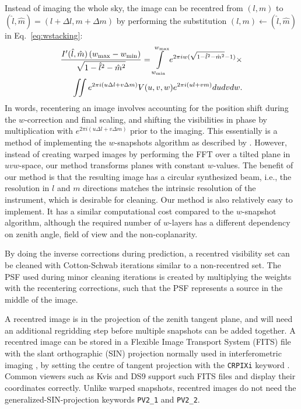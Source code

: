 \documentclass[useAMS,usenatbib]{mn2e}
\begin{document}
Instead of imaging the whole sky, the image can be recentred from $(l,m)$ to $(\hat{l},\hat{m})=(l+\Delta l,m+\Delta m)$ by performing the substitution $(l,m)\leftarrow(\hat{l},\hat{m})$ in Eq.~\eqref{eq:wstacking}:
\begin{align}\notag
\frac{I'(\hat{l}, \hat{m})\left(w_{\max} - w_{\min}\right)}{\sqrt{1-\hat{l}^2-\hat{m}^2}} = \int\limits_{w_{\min}}^{w_{\max}} e^{2\pi i w(\sqrt{1-\hat{l}^2-\hat{m}^2}-1)} \times \\
\iint e^{2 \pi i \left(u\Delta l + v\Delta m\right)} V(u,v,w) e^{2\pi i \left(ul + vm\right)} du dv dw.
\end{align}
In words, recentering an image involves accounting for the position shift during the $w$-correction and final scaling, and shifting the visibilities in phase by multiplication with $e^{2 \pi i \left(u\Delta l + v\Delta m\right)}$ prior to the imaging. This essentially is a method of implementing the $w$-snapshots algorithm as described by \citet{widefield-imaging-ska-cornwell}. However, instead of creating warped images by performing the FFT over a tilted plane in $uvw$-space, our method transforms planes with constant $w$-values. The benefit of our method is that the resulting image has a circular synthesized beam, i.e., the resolution in $l$ and $m$ directions matches the intrinsic resolution of the instrument, which is desirable for cleaning. Our method is also relatively easy to implement. It has a similar computational cost compared to the $w$-snapshot algorithm, although the required number of $w$-layers has a different dependency on zenith angle, field of view and the non-coplanarity.

By doing the inverse corrections during prediction, a recentred visibility set can be cleaned with Cotton-Schwab iterations similar to a non-recentred set. The PSF used during minor cleaning iterations is created by multiplying the weights with the recentering corrections, such that the PSF represents a source in the middle of the image.

A recentred image is in the projection of the zenith tangent plane, and will need an additional regridding step before multiple snapshots can be added together. A recentred image can be stored in a Flexible Image Transport System (FITS) file with the slant orthographic (SIN) projection normally used in interferometric imaging \citep{fits-coordinates-2002}, by setting the centre of tangent projection with the \texttt{CRPIXi} keyword \citep{wcs-in-fits}. Common viewers such as Kvis and DS9 support such FITS files and display their coordinates correctly. Unlike warped snapshots, recentred images do not need the generalized-SIN-projection keywords \texttt{PV2\_1} and \texttt{PV2\_2}.
\end{document}
